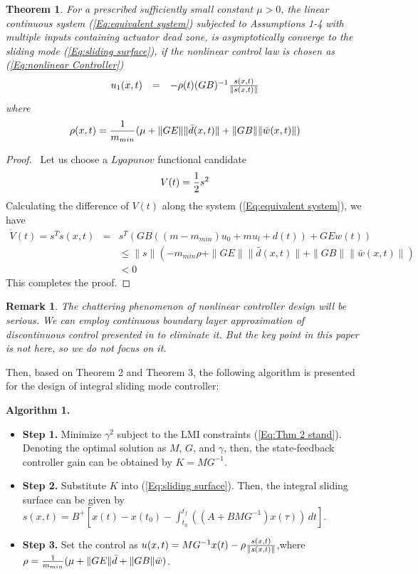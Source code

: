 \documentclass[journal,onecolumn]{IEEEtran}
\newtheorem{Thm}{Theorem}
\newtheorem{rem}{Remark}
\begin{document}
\begin{Thm}\label{thm3}
For a prescribed sufficiently small constant $\mu>0$, the linear
continuous system (\ref{Eq:equivalent system}) subjected to
Assumptions 1-4 with multiple inputs containing actuator dead zone,
is asymptotically converge to the sliding mode (\ref{Eq:sliding
surface}), if the nonlinear control law is chosen as
(\ref{Eq:nonlinear Controller})
\begin{equation}
\label{Eq:nonlinear Controller}
\begin{array}{rcl}
u_1(x,t)&=&-\rho(t)(GB)^{-1}{s(x,t)\over \|s(x,t)\|}\\[1mm]
\end{array}
\end{equation}
where
\begin{eqnarray*}
\rho(x,t)={1\over
m_{min}}(\mu+\|GE\|\|{\bar{d}(x,t)}\|+\|GB\|\|{\bar{w}(x,t)}\|)
\end{eqnarray*}
\end{Thm}

 \begin{proof}
~Let us choose a $Lyapunov$ functional candidate
 \begin{equation*}
\label{EQ:lyapunov function} V(t) = {1\over 2} s^2
\end{equation*}
Calculating the difference of $V(t)$ along the system
(\ref{Eq:equivalent system}), we have
\begin{eqnarray*}
\dot
V(t)=s^T\dot{s}(x,t)&=&s^T(GB((m-{m_{min}})u_0+mu_l+d(t))+GEw(t))\\&&
\leq
\|s\|(-m_{min}\rho+\|GE\|\|{\bar{d}(x,t)}\|+\|GB\|\|{\bar{w}(x,t)}\|)\\&&<0
\end{eqnarray*}
 This completes the proof.
 \end{proof}


\begin{rem}\label{re5}
The chattering phenomenon of nonlinear controller design will be
serious. We can employ continuous boundary layer approximation of
discontinuous control presented in \cite{27,28} to eliminate it. But
the key point in this paper is not here, so we do not focus on it.
\end{rem}



Then, based on Theorem 2 and Theorem 3, the following algorithm is
presented for the design of integral sliding mode controller:

{\bf Algorithm 1.}
\begin{itemize}
\item[]{\bf Step 1.} Minimize $\gamma^2$ subject to the LMI
constraints (\ref{Eq:Thm 2 stand}). Denoting the optimal solution as
$M$,  $G$, and $\gamma$, then, the state-feedback controller gain
 can be obtained by $K=MG^{-1}$.
\item[]{\bf Step 2.} Substitute $K$ into (\ref{Eq:sliding
surface}). Then, the integral sliding surface can be given by
$s(x,t)=B^+[x(t)-x(t_0)-\int_{t_0}^{t_{f}}((A+BMG^{-1})x(\tau))\,dt]$.
\item[]{\bf Step 3.} Set the control as $u(x,t)=MG^{-1}x(t)-\rho{s(x,t)\over
 \|s(x,t)\|}$,where $\rho={1\over
m_{min}}(\mu+\|GE\|{\bar{d}}+\|GB\|{\bar{w}})$.
\end{itemize}
\end{document}
